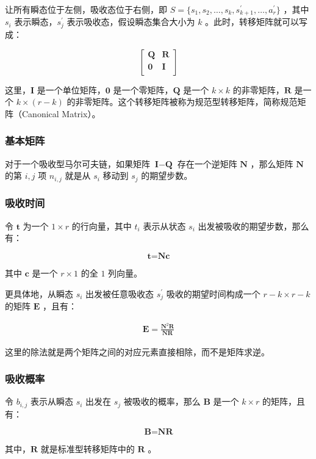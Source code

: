 \documentclass{article}
\begin{document}
让所有瞬态位于左侧，吸收态位于右侧，即 $S=\{s_1,s_2,\ldots,s_k,s^{\prime}_{k+1},\ldots, a^{\prime}_r\}$ ，其中 $s_i$ 表示瞬态，$s^{\prime}_j$ 表示吸收态，假设瞬态集合大小为 $k$ 。此时，转移矩阵就可以写成：

$$
\begin{bmatrix}
\textbf{Q} & \textbf{R}\\
\textbf{0} & \textbf{I}\\
\end{bmatrix}
$$

这里，$\textbf{I}$ 是一个单位矩阵，$\textbf{0}$ 是一个零矩阵，$\textbf{Q}$ 是一个 $k\times k$ 的非零矩阵，$\textbf{R}$ 是一个 $k\times (r-k)$ 的非零矩阵。这个转移矩阵被称为规范型转移矩阵，简称规范矩阵（Canonical Matrix）。

\subsubsection{基本矩阵}
对于一个吸收型马尔可夫链，如果矩阵 $\textbf{I}-\textbf{Q}$ 存在一个逆矩阵 $\textbf{N}$ ，那么矩阵 $\textbf{N}$ 的第 $i,j$ 项 $n_{i,j}$ 就是从 $s_i$ 移动到 $s_j$ 的期望步数。

\subsubsection{吸收时间}
令 $\textbf{t}$ 为一个 $1\times r$ 的行向量，其中 $t_i$ 表示从状态 $s_i$ 出发被吸收的期望步数，那么有：

$$\textbf{t}=\textbf{Nc}$$

其中 $\textbf{c}$ 是一个 $r\times 1$ 的全 $1$ 列向量。

更具体地，从瞬态 $s_i$ 出发被任意吸收态 $s^{\prime}_{j}$ 吸收的期望时间构成一个 $r-k \times r-k$ 的矩阵 $\textbf{E}$ ，且有：

$$
\begin{aligned}
\textbf{E} = \frac{\textbf{N}^2\textbf{R}}{\textbf{NR}}
\end{aligned}
$$

这里的除法就是两个矩阵之间的对应元素直接相除，而不是矩阵求逆。

\subsubsection{吸收概率}
令 $b_{i,j}$ 表示从瞬态 $s_i$ 出发在 $s_j$ 被吸收的概率，那么 $\textbf{B}$ 是一个 $k\times r$ 的矩阵，且有：

$$\textbf{B}=\textbf{NR}$$

其中，$\textbf{R}$ 就是标准型转移矩阵中的 $\textbf{R}$ 。
\end{document}
